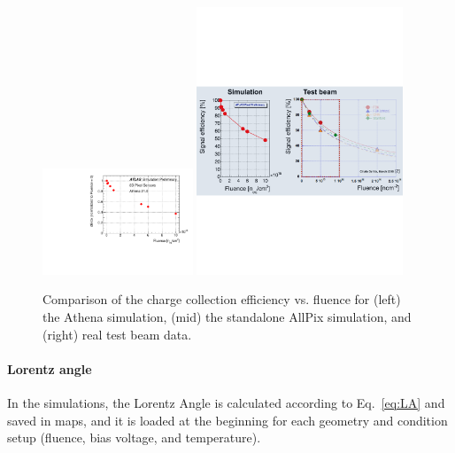 \begin{figure}[htbp]
\begin{center}
\includegraphics[width=0.40\textwidth]{figures/SensorSimulation/3D_athena.pdf}
\includegraphics[width=0.55\textwidth, trim=0cm 8.5cm 0cm 0cm]{figures/SensorSimulation/3D_allpix.pdf}
\caption{Comparison of the charge collection efficiency vs. fluence for (left) the Athena simulation, (mid) the standalone AllPix simulation, and (right) real test beam data.}
\label{3D_athena}
\end{center}
\end{figure}


\paragraph*{Lorentz angle}
In the simulations, the Lorentz Angle is calculated according to Eq.~\ref{eq:LA}  and saved in maps, and it is loaded at the beginning for each geometry and condition setup (fluence, bias voltage, and temperature). 

